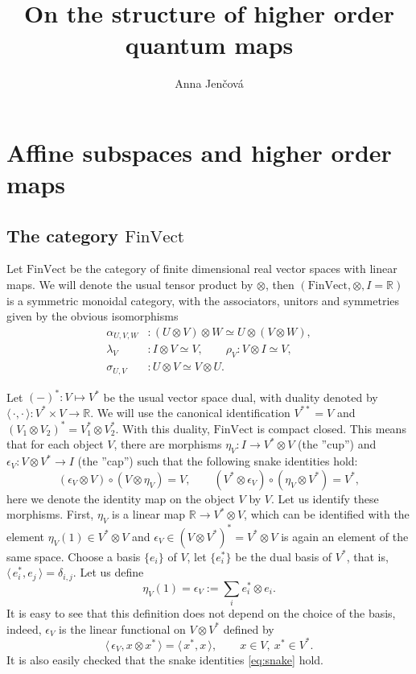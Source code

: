 \documentclass[12pt]{article}
\title{On the structure of  higher order quantum maps}
\author{Anna Jen\v cov\'a}
\theoremstyle{definition}
\theoremstyle{remark}
\def\<{\langle\,}
\def\>{\,\rangle}
\def \FV{\mathrm{FinVect}}
\begin{document}
\maketitle

\section{Affine subspaces and higher order maps}

\subsection{The category $\FV$} \label{sec:fv}

Let  $\FV$ be the category of finite dimensional real vector spaces with linear maps. 
We will denote the usual tensor product by $\otimes$, then  $(\FV,\otimes, I=\mathbb R)$
is a symmetric monoidal category, with the associators, unitors and symmetries given by
the obvious isomorphisms 
\begin{align*}
\alpha_{U,V,W}&:(U\otimes V)\otimes W\simeq U\otimes (V\otimes W), \\
\lambda_V&: I\otimes
V\simeq
V, \qquad \rho_V: V\otimes I\simeq V,\\
\sigma_{U,V}&: U\otimes V\simeq V\otimes U.
\end{align*}




Let  $(-)^*: V\mapsto V^*$ be the usual vector space dual, with duality denoted by
$\<\cdot,\cdot\>: V^*\times V\to \mathbb R$. We will use the canonical identification
$V^{**}=V$ and $(V_1\otimes V_2)^*=V_1^*\otimes V_2^*$. With this duality, $\FV$ is
compact closed. This means that for each object $V$, there are morphisms $\eta_V: I\to V^*\otimes
V$ (the ''cup'') and $\epsilon_V: V\otimes V^*\to I$ (the ''cap'') such that the following snake
identities hold:
\begin{equation}\label{eq:snake}
(\epsilon_V\otimes V)\circ (V\otimes \eta_V)=V,\qquad (V^*\otimes \epsilon_V)\circ
(\eta_V\otimes V^*)=V^*,
\end{equation}
here we denote the identity map on the object $V$ by $V$. Let us identify these morphisms.
First, $\eta_V$ is a linear map $\mathbb R\to V^*\otimes V$, which can be
identified with the element $\eta_V(1)\in V^*\otimes V$ and   $\epsilon_V\in (V\otimes
V^*)^*=V^*\otimes V$ is again an element of the same space.  Choose a basis
$\{e_i\}$ of $V$, let $\{e_i^*\}$ be the dual basis of $V^*$, that is,
$\<e_i^*,e_j\>=\delta_{i,j}$. Let us define
\[
\eta_V(1)=\epsilon_V:=\sum_i e_i^*\otimes e_i.
\]
It is easy to see that this definition does not depend on the choice of the basis, indeed,
$\epsilon_V$ is the linear functional on $V\otimes V^*$ defined by
\[
\<\epsilon_V, x\otimes x^*\>=\<x^*,x\>,\qquad x\in V, \ x^*\in V^*.
\]
It is also easily checked that the snake identities \eqref{eq:snake} hold.
\end{document}
